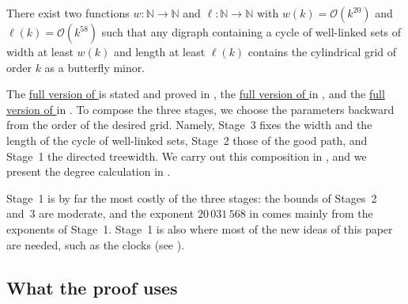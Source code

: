 \documentclass[fontsize=12pt,leading=14pt]{fullpaper}
\newcommand{\Ocal}{\mathcal{O}}
\newcommand{\NN}{\mathbb{N}}
\newcounter{step}
\begin{document}
\begin{theorem}\label{thm:intro-stage3}
  There exist two functions $w\colon \NN \to \NN$ and $\ell \colon \NN \to \NN$ with $w(k) = \Ocal(k^{20})$ and $\ell(k) = \Ocal(k^{58})$ such that any digraph containing a cycle of well-linked sets of width at least $w(k)$ and length at least $\ell(k)$ contains the cylindrical grid of order $k$ as a butterfly minor.
\end{theorem}

The \hyperref[thm:stage1]{full version of } is stated and proved in , the \hyperref[thm:closing]{full version of } in , and the \hyperref[thm:stage3]{full version of } in .
To compose the three stages, we choose the parameters backward from the order of the desired grid.
Namely, Stage~3 fixes the width and the length of the cycle of well-linked sets, Stage~2 those of the good path, and Stage~1 the directed treewidth.
We carry out this composition in , and we present the degree calculation in .

Stage~1 is by far the most costly of the three stages: the bounds of Stages~2 and~3 are moderate, and the exponent $20\,031\,568$ in  comes mainly from the exponents of Stage~1.
Stage~1 is also where most of the new ideas of this paper are needed, such as the clocks (see ).

\subsection{What the proof uses}\label{sec:intro-uses}
\end{document}
